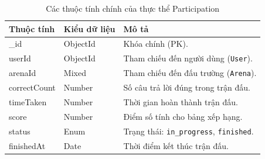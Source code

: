 \begin{table}[H]
	\centering
	\begin{tabularx}{\textwidth}{|l|l|X|}
		\hline
		\textbf{Thuộc tính} & \textbf{Kiểu dữ liệu} & \textbf{Mô tả} \\ \hline
		\_id & ObjectId & Khóa chính (PK). \\ \hline
		userId & ObjectId & Tham chiếu đến người dùng (\texttt{User}). \\ \hline
		arenaId & Mixed & Tham chiếu đến đấu trường (\texttt{Arena}). \\ \hline
		correctCount & Number & Số câu trả lời đúng trong trận đấu. \\ \hline
		timeTaken & Number & Thời gian hoàn thành trận đấu. \\ \hline
		score & Number & Điểm số tính cho bảng xếp hạng. \\ \hline
		status & Enum & Trạng thái: \texttt{in\_progress}, \texttt{finished}. \\ \hline
		finishedAt & Date & Thời điểm kết thúc trận đấu. \\ \hline
	\end{tabularx}
	\caption{Các thuộc tính chính của thực thể Participation}
\end{table}


